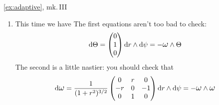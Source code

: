 \begin{examples*}{\ref{ex:adaptive}, mk.\,III}{}
\begin{enumerate}
  \item\label{exs:paraboloidconnectionform} This time we have \bigbreak
	The first equations aren't too bad to check:
	\[\D\Theta=\threevec 010\dr\wedge\D\psi=-\lomega\wedge\Theta\]
  The second is a little nastier: you should check that
  \begin{align*}
  \D\lomega
	=
	\frac 1{(1+r^2)^{3/2}}
	\begin{pmatrix}
		0&r&0\\
		-r&0&-1\\
		0&1&0
	\end{pmatrix}
	\dr\wedge\D\psi =-\lomega\wedge\lomega 
  \end{align*}
\end{enumerate}
\end{examples*}


% 

